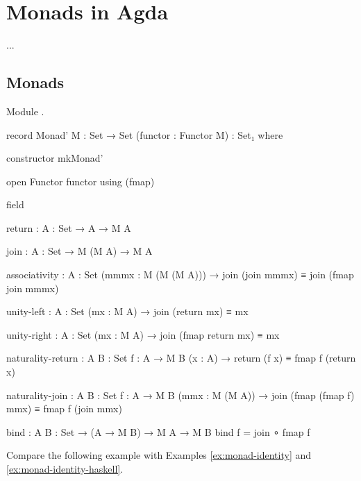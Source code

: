 \section{Monads in Agda}
\label{sec:monads-agda}

...


\subsection*{Monads}

Module .

\begin{codeagda}
record Monad' {M : Set → Set} (functor : Functor M) : Set₁ where

  constructor mkMonad'

  open Functor functor using (fmap)

  field

    return : {A : Set} → A → M A

    join   : {A : Set} → M (M A) → M A

    associativity : {A : Set} (mmmx : M (M (M A))) →
                    join (join mmmx) ≡ join (fmap join mmmx)

    unity-left    : {A : Set} (mx : M A) → join (return mx) ≡ mx

    unity-right   : {A : Set} (mx : M A) → join (fmap return mx) ≡ mx

    naturality-return : {A B : Set} {f : A → M B} (x : A) →
                        return (f x) ≡ fmap f (return x)

    naturality-join   : {A B : Set} {f : A → M B} (mmx : M (M A)) →
                        join (fmap (fmap f) mmx) ≡ fmap f (join mmx)

  bind : {A B : Set} → (A → M B) → M A → M B
  bind f = join ∘ fmap f
\end{codeagda}

Compare the following example with Examples \ref{ex:monad-identity}
and \ref{ex:monad-identity-haskell}.


